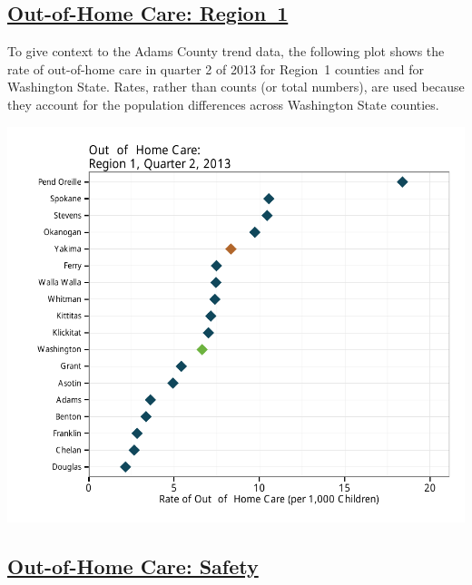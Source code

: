 \documentclass{article}\usepackage[]{graphicx}\usepackage[]{color}
\makeatletter
\def\maxwidth{ %
  \ifdim\Gin@nat@width>\linewidth
    \linewidth
  \else
    \Gin@nat@width
  \fi
}
\newenvironment{knitrout}{}{} %
\makeatother
\begin{document}
\begin{minipage}{\textwidth}
\subsection{\href{http://www.partnersforourchildren.org/child-well-being/visualizations/out-home-care/trends}
    {Out-of-Home Care: Region~1}
}
To give context to the Adams County trend data, the following plot shows the rate of out-of-home care in quarter 2 of 2013 for Region~1 counties and for Washington State. Rates, rather than counts (or total numbers), are used because they account for the population differences across Washington State counties.\\[1pt]
\begin{knitrout}
\color{fgcolor}

{\centering \includegraphics[width=\maxwidth]{figure/ooh_context} 

}



\end{knitrout}

\end{minipage}
\newpage

\subsection{\href{http://www.partnersforourchildren.org/child-well-being/visualizations/out-home-care/safety}
    {Out-of-Home Care: Safety}
}
\end{document}

